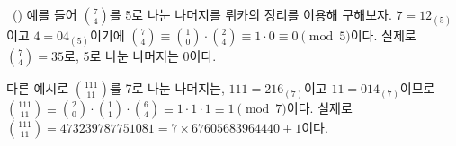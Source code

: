 \begin{problem}{\kcpcprobserver\ (\kcpcprobservershort)}
    예를 들어 $\binom{7}{4}$를 5로 나눈 나머지를 뤼카의 정리를 이용해 구해보자. $7 = 12_{(5)}$이고 $4 = 04_{(5)}$이기에 $ \binom{7}{4} \equiv \binom{1}{0} \cdot \binom{2}{4} \equiv 1 \cdot 0 \equiv 0 \pmod 5$이다. 실제로 $\binom{7}{4} = 35$로, 5로 나눈 나머지는 0이다.
    
    다른 예시로 $ \binom{111}{11} $를 7로 나눈 나머지는, $ 111 = 216_{(7)}$이고 $ 11 = 014_{(7)} $이므로 $ \binom{111}{11} \equiv \binom{2}{0} \cdot \binom{1}{1} \cdot \binom{6}{4} \equiv 1 \cdot 1 \cdot 1 \equiv 1 \pmod 7 $이다. 실제로 $ \binom{111}{11} = 473239787751081 = 7 \times 67605683964440 + 1$이다.
    
\end{problem}

